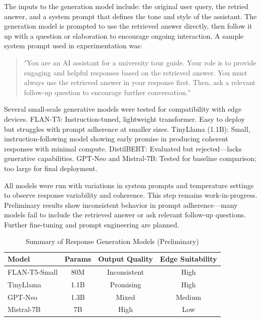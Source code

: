 \documentclass[conference]{IEEEtran}
\begin{document}
The inputs to the generation model include: the original user query, the retried answer, and a system prompt that defines the tone and style of the assistant.
The generation model is prompted to use the retrieved answer directly, then follow it up with a question or elaboration to encourage ongoing interaction. 
A sample system prompt used in experimentation was:

\begin{quote}
    "You are an AI assistant for a university tour guide. 
    Your role is to provide engaging and helpful responses based on the retrieved answer. 
    You must always use the retrieved answer in your response first. 
    Then, ask a relevant follow-up question to encourage further conversation."
\end{quote}

Several small-scale generative models were tested for compatibility with edge devices.
FLAN-T5: Instruction-tuned, lightweight transformer. Easy to deploy but struggles with prompt adherence at smaller sizes.
TinyLlama (1.1B): Small, instruction-following model showing early promise in producing coherent responses with minimal compute.
DistilBERT: Evaluated but rejected—lacks generative capabilities.
GPT-Neo and Mistral-7B: Tested for baseline comparison; too large for final deployment.

All models were run with variations in system prompts and temperature settings to observe response variability and coherence.
This step remains work-in-progress. 
Preliminary results show inconsistent behavior in prompt adherence—many models fail to include the retrieved answer or ask relevant follow-up questions. 
Further fine-tuning and prompt engineering are planned.

\begin{table}[h]
    \centering
    \caption{Summary of Response Generation Models (Preliminary)}
    \begin{tabular}{l|c|c|c}
    \hline
    \textbf{Model} & \textbf{Params} & \textbf{Output Quality} & \textbf{Edge Suitability} \\
    \hline
    FLAN-T5-Small & 80M & Inconsistent & High  \\
    TinyLlama & 1.1B & Promising & High  \\
    GPT-Neo & 1.3B & Mixed & Medium  \\
    Mistral-7B & 7B & High & Low  \\
    \hline
    \end{tabular}
    \label{tab:generation_models}
\end{table}
\end{document}
